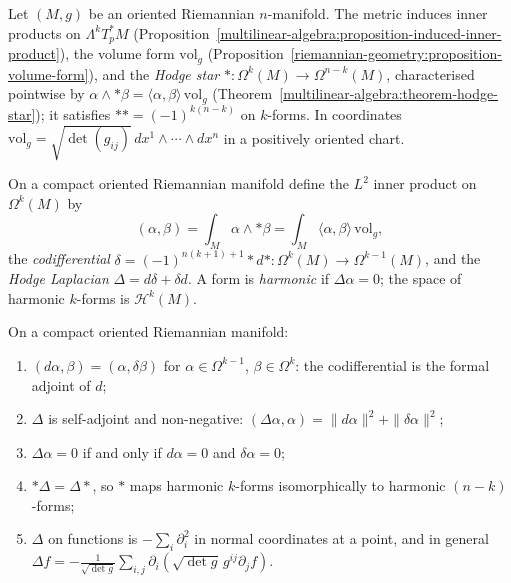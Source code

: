 \begin{definition}\label{riemannian-geometry:definition-hodge-star}
Let $(M, g)$ be an oriented Riemannian $n$-manifold. The metric induces inner products on $\Lambda^kT^*_pM$ (Proposition~\ref{multilinear-algebra:proposition-induced-inner-product}), the volume form
$\mathrm{vol}_g$ (Proposition~\ref{riemannian-geometry:proposition-volume-form}), and the \emph{Hodge star} $* \colon \Omega^k(M) \to \Omega^{n-k}(M)$, characterised pointwise by $\alpha \wedge *\beta = \langle\alpha, \beta\rangle\,\mathrm{vol}_g$
(Theorem~\ref{multilinear-algebra:theorem-hodge-star}); it satisfies $** = (-1)^{k(n-k)}$ on $k$-forms. In coordinates $\mathrm{vol}_g = \sqrt{\det(g_{ij})}\,dx^1 \wedge \cdots \wedge dx^n$ in a positively
oriented chart.
\end{definition}

\begin{definition}\label{riemannian-geometry:definition-laplacian}
On a compact oriented Riemannian manifold define the $L^2$ inner product on $\Omega^k(M)$ by
\[
(\alpha, \beta) = \int_M\alpha \wedge *\beta = \int_M\langle\alpha, \beta\rangle\,\mathrm{vol}_g,
\]
the \emph{codifferential} $\delta = (-1)^{n(k+1)+1}*d* \colon \Omega^k(M) \to \Omega^{k-1}(M)$, and the \emph{Hodge Laplacian} $\Delta = d\delta + \delta d$. A form is \emph{harmonic} if $\Delta\alpha = 0$; the space of
harmonic $k$-forms is $\mathcal{H}^k(M)$.
\end{definition}

\begin{proposition}\label{riemannian-geometry:proposition-adjoint}
On a compact oriented Riemannian manifold:
\begin{enumerate}
\item $(d\alpha, \beta) = (\alpha, \delta\beta)$ for $\alpha \in \Omega^{k-1}$, $\beta \in \Omega^k$: the codifferential is the formal adjoint of $d$;
\item $\Delta$ is self-adjoint and non-negative: $(\Delta\alpha, \alpha) = \|d\alpha\|^2 + \|\delta\alpha\|^2$;
\item $\Delta\alpha = 0$ if and only if $d\alpha = 0$ and $\delta\alpha = 0$;
\item $*\Delta = \Delta*$, so $*$ maps harmonic $k$-forms isomorphically to harmonic $(n-k)$-forms;
\item $\Delta$ on functions is $-\sum_{i}\partial_i^2$ in normal coordinates at a point, and in general
$\Delta f = -\frac{1}{\sqrt{\det g}}\sum_{i,j}\partial_i(\sqrt{\det g}\,g^{ij}\partial_jf)$.
\end{enumerate}
\end{proposition}


